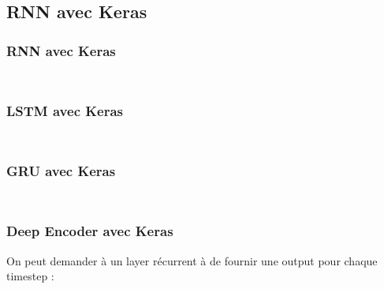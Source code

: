 \subsection{RNN avec Keras}

\begin{frame}
  \frametitle{RNN avec Keras}
  \inputminted[linenos,fontsize=\small,bgcolor=pythonbg]{python}{code-illustration/tf-keras-rnn.py}
  \inputminted[linenos,fontsize=\small,bgcolor=returnbg]{python}{code-illustration/tf-keras-rnn.txt}
\end{frame}

\begin{frame}
  \frametitle{LSTM avec Keras}
  \inputminted[linenos,fontsize=\small,bgcolor=pythonbg]{python}{code-illustration/tf-keras-lstm.py}
  \inputminted[linenos,fontsize=\small,bgcolor=returnbg]{python}{code-illustration/tf-keras-lstm.txt}
\end{frame}

\begin{frame}
  \frametitle{GRU avec Keras}
  \inputminted[linenos,fontsize=\small,bgcolor=pythonbg]{python}{code-illustration/tf-keras-gru.py}
  \inputminted[linenos,fontsize=\small,bgcolor=returnbg]{python}{code-illustration/tf-keras-gru.txt}
\end{frame}

\begin{frame}
  \frametitle{Deep Encoder avec Keras}
  On peut demander à un layer récurrent à de fournir une output pour chaque timestep :
  \inputminted[linenos,fontsize=\small,bgcolor=pythonbg]{python}{code-illustration/tf-keras-rnn-all-timestep.py}
  \inputminted[linenos,fontsize=\small,bgcolor=returnbg]{python}{code-illustration/tf-keras-gru.txt}
\end{frame}
